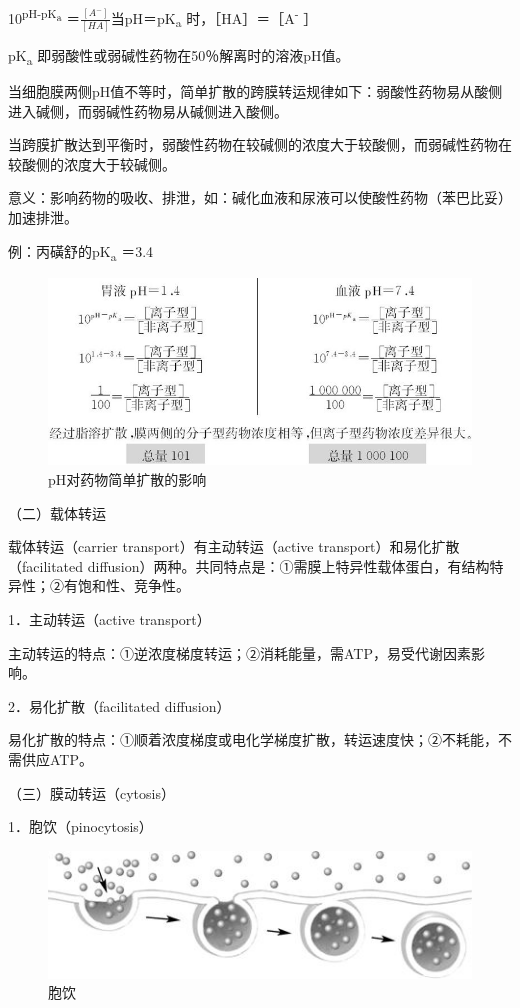 10\textsuperscript{pH-pK\textsubscript{a}}
＝$\frac{[A^-]}{[HA]}$当pH＝pK\textsubscript{a}
时，［HA］＝［A\textsuperscript{-} ］

pK\textsubscript{a} 即弱酸性或弱碱性药物在50％解离时的溶液pH值。

当细胞膜两侧pH值不等时，简单扩散的跨膜转运规律如下：弱酸性药物易从酸侧进入碱侧，而弱碱性药物易从碱侧进入酸侧。

当跨膜扩散达到平衡时，弱酸性药物在较碱侧的浓度大于较酸侧，而弱碱性药物在较酸侧的浓度大于较碱侧。

意义：影响药物的吸收、排泄，如：碱化血液和尿液可以使酸性药物（苯巴比妥）加速排泄。

例：丙磺舒的pK\textsubscript{a} ＝3.4

\begin{figure}[!htbp]
 \centering
 \includegraphics{./images/Image00028.jpg}
 \captionsetup{justification=centering}
 \caption{pH对药物简单扩散的影响}
 \label{fig3-2}
  \end{figure} 

（二）载体转运

载体转运（carrier transport）有主动转运（active
transport）和易化扩散（facilitated
diffusion）两种。共同特点是：①需膜上特异性载体蛋白，有结构特异性；②有饱和性、竞争性。

1．主动转运（active transport）

主动转运的特点：①逆浓度梯度转运；②消耗能量，需ATP，易受代谢因素影响。

2．易化扩散（facilitated diffusion）

易化扩散的特点：①顺着浓度梯度或电化学梯度扩散，转运速度快；②不耗能，不需供应ATP。

（三）膜动转运（cytosis）

1．胞饮（pinocytosis）

\begin{figure}[!htbp]
 \centering
 \includegraphics{./images/Image00029.jpg}
 \captionsetup{justification=centering}
 \caption{胞饮}
 \label{fig3-3}
  \end{figure} 

